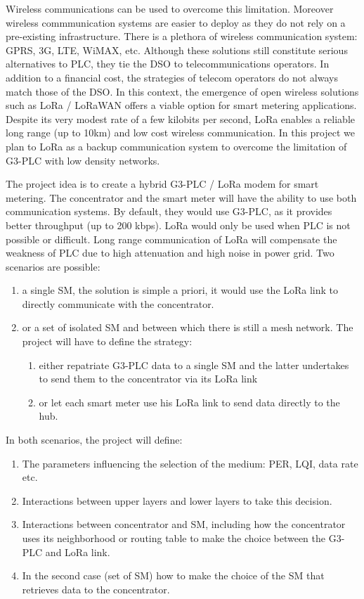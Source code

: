 \documentclass[a4paper,10pt]{article}
\begin{document}
Wireless communications can be used to overcome this
limitation. Moreover wireless commmunication systems are
easier to deploy as they do not rely on a pre-existing
infrastructure. There is a plethora of wireless
communication system: GPRS, 3G, LTE, WiMAX, etc. Although
these solutions still constitute serious alternatives to
PLC, they tie the DSO to telecommunications operators. In
addition to a financial cost, the strategies of telecom
operators do not always match those of the DSO. In this
context, the emergence of open wireless solutions such as
LoRa / LoRaWAN offers a viable option for smart metering
applications. Despite its very modest rate of a few kilobits
per second, LoRa enables a reliable long range (up to 10km)
and low cost wireless communication. In this project we plan
to LoRa as a backup communication system to overcome the
limitation of G3-PLC with low density networks.

The project idea is to create a hybrid G3-PLC / LoRa modem
for smart metering. The concentrator and the smart meter
will have the ability to use both communication systems. By
default, they would use G3-PLC, as it provides better
throughput (up to 200 kbps). LoRa would only be used when
PLC is not possible or difficult. Long range communication
of LoRa will compensate the weakness of PLC due to high
attenuation and high noise in power grid. Two scenarios are
possible:

\begin{enumerate}
  \itemsep -0.5em
  \item a single SM, the solution is simple a priori, it would use the LoRa link to directly communicate with the concentrator.
  \item or a set of isolated SM and between which there is still a mesh network. The project will have to define the strategy:
    \begin{enumerate}
      \itemsep -0.5em
      \item either repatriate G3-PLC data to a single SM and the latter undertakes to send them to the concentrator via its LoRa link
      \item or let each smart meter use his LoRa link to send data directly to the hub.
    \end{enumerate}
\end{enumerate}

In both scenarios, the project will define:

\begin{enumerate}
  \itemsep -0.5em
  \item The parameters influencing the selection of the medium: PER, LQI, data rate etc.
  \item Interactions between upper layers and lower layers to take this decision.
  \item Interactions between concentrator and SM, including how the concentrator uses its neighborhood or routing table to make the choice between the G3-PLC and LoRa link.
  \item In the second case (set of SM) how to make the choice of the SM that retrieves data to the concentrator.
\end{enumerate}
\end{document}
